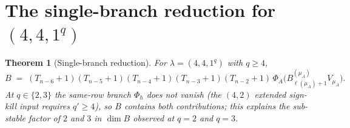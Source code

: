 \documentclass[11pt]{article}
\newtheorem{theorem}{Theorem}
\theoremstyle{definition}
\begin{document}
\section{The single-branch reduction for $(4, 4, 1^q)$}\label{sec:reduction}

\begin{theorem}[Single-branch reduction]\label{thm:reduction}
For $\lambda = (4, 4, 1^q)$ with $q \ge 4$,
\begin{equation}\label{eq:reduction}
   B \;=\; (T_{n-6}{+}1)(T_{n-5}{+}1)(T_{n-4}{+}1)(T_{n-3}{+}1)(T_{n-2}{+}1)\,
   \Phi_A\bigl(B^{(\mu_A)}_{\ell(\mu_A)+1} V_{\mu_A}\bigr).
\end{equation}
At $q \in \{2, 3\}$ the same-row branch $\Phi_h$ does \emph{not}
vanish (the $(4, 2)$ extended sign-kill input requires $q' \ge 4$),
so $B$ contains both contributions; this explains the sub-stable
factor of $2$ and $3$ in $\dim B$ observed at $q = 2$ and $q = 3$.
\end{theorem}
\end{document}
